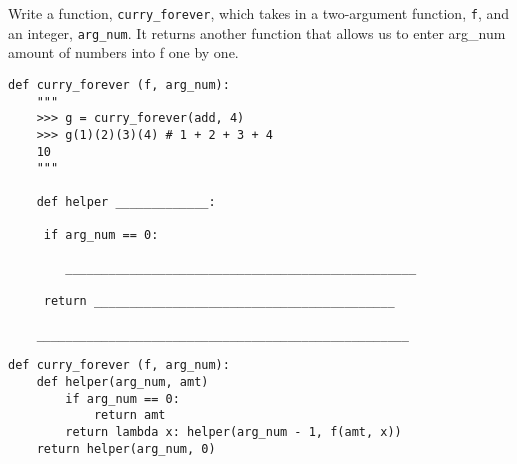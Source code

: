 \begin{blocksection}
\question Write a function, \texttt{curry\_forever}, which takes in a two-argument function, \texttt{f}, and an integer, \texttt{arg\_num}. It returns another function that allows us to enter arg\_num amount of numbers into f one by one.

\begin{lstlisting}
def curry_forever (f, arg_num):
    """
    >>> g = curry_forever(add, 4)
    >>> g(1)(2)(3)(4) # 1 + 2 + 3 + 4
    10 
    """

    def helper _____________:
    
   	 if arg_num == 0:
   	 
   	    _________________________________________________
   	    
   	 return __________________________________________
   	 
    ____________________________________________________

\end{lstlisting}

\begin{solution}
\begin{lstlisting}
def curry_forever (f, arg_num):
    def helper(arg_num, amt)
   	    if arg_num == 0:
   		    return amt
   	    return lambda x: helper(arg_num - 1, f(amt, x))
    return helper(arg_num, 0)


\end{lstlisting}
\end{solution}
\end{blocksection}

